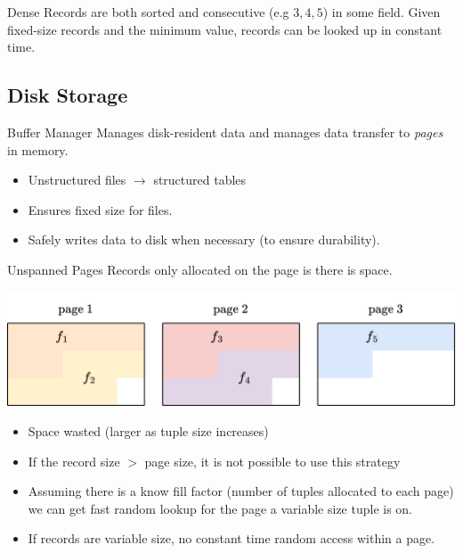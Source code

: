 \begin{definitionbox}{Dense}
    Records are both sorted and consecutive (e.g $3,4,5$) in some field. Given fixed-size records and the minimum value, records can be looked up in constant time. 
\end{definitionbox}

\subsection{Disk Storage}
\begin{definitionbox}{Buffer Manager}
    Manages disk-resident data and manages data transfer to \textit{pages} in memory.
    \begin{itemize}
        \item Unstructured files $\to$ structured tables
        \item Ensures fixed size for files.
        \item Safely writes data to disk when necessary (to ensure durability).
    \end{itemize}
\end{definitionbox}

\begin{definitionbox}{Unspanned Pages}
    Records only allocated on the page is there is space.
    \begin{center}
        \includegraphics[width=.8\textwidth]{storage/images/unspanned_page.drawio.png}
    \end{center}
    \begin{itemize}
        \item Space wasted (larger as tuple size increases)
        \item If the record size $>$ page size, it is not possible to use this strategy
        \item Assuming there is a know fill factor (number of tuples allocated to each page) we can get fast random lookup for the page a variable size tuple is on.
        \item If records are variable size, no constant time random access within a page.
    \end{itemize}
\end{definitionbox}

